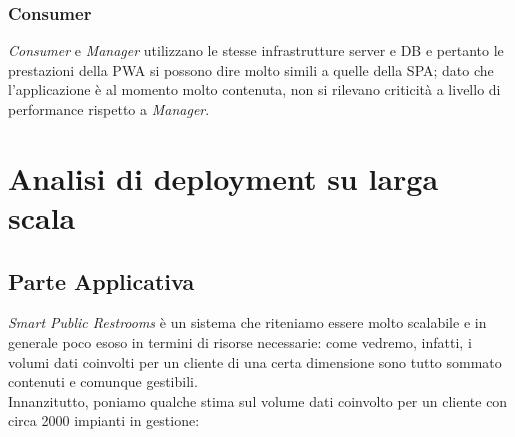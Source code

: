 \documentclass[12pt]{article}
\begin{document}
\subsubsection{Consumer}
\textit{Consumer} e \textit{Manager} utilizzano le stesse infrastrutture server e DB e pertanto le prestazioni della PWA si possono dire molto simili a quelle della SPA; dato che l'applicazione è al momento molto contenuta, non si rilevano criticità a livello di performance rispetto a \textit{Manager}.

\section{Analisi di deployment su larga scala}
\subsection{Parte Applicativa}
\textit{Smart Public Restrooms} è un sistema che riteniamo essere molto scalabile e in generale poco esoso in termini di risorse necessarie: come vedremo, infatti, i volumi dati coinvolti per un cliente di una certa dimensione sono tutto sommato contenuti e comunque gestibili.\\
Innanzitutto, poniamo qualche stima sul volume dati coinvolto per un cliente con circa 2000 impianti in gestione: 
\end{document}

